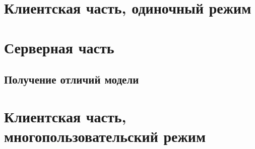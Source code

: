\TODO

\section{Клиентская часть, одиночный режим}

\TODO

\section{Серверная часть}

\subsection{Получение отличий модели}\label{model-diff-implementation}

\TODO

\section{Клиентская часть, многопользовательский режим}

\TODO
